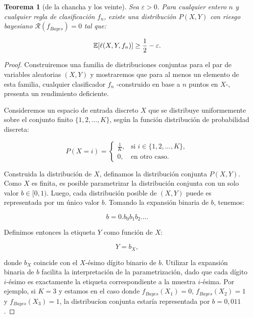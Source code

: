 \documentclass{article}
\newtheorem{thm}{Teorema}[subsection]
\begin{document}
\begin{thm}[de la chancha y los veinte]
Sea \(\varepsilon > 0\). Para cualquier entero \(n\) y cualquier 
regla de clasificación \(f_n\), existe una distribución \(P(X, Y)\) con riesgo bayesiano 
\(\mathcal{R}(f_{Bayes}) = 0\) tal que:

\[
\mathbb{E}[\ell(X,Y,f_n)] \geq \frac{1}{2} - \varepsilon.\newline
\]
\end{thm}

\begin{proof}

Construiremos una familia de distribuciones conjuntas para el par de variables aleatorias \((X, Y)\) y mostraremos que para al menos un 
elemento de esta familia, cualquier clasificador \(f_n\) -construido en base a $n$ puntos en $X$-, presenta un rendimiento deficiente.\newline

Consideremos un espacio de entrada 
discreto \(X\) que se distribuye uniformemente sobre el conjunto finito \(\{1, 2, \dots, K\}\), 
según la función distribución de probabilidad discreta:

\[
P(X = i) = \begin{cases} 
\frac{1}{K}, & \text{si } i \in \{1, 2, \dots, K\}, \\ 
0, & \text{en otro caso}.
\end{cases}
\]


Construida la distribución de \(X\), definamos la distribución conjunta \(P(X,Y)\). Como \(X\) es finita,
es posible parametrizar la distribución conjunta con un solo valor
\(b \in [0,1)\). Luego, cada distribución posible de $(X,Y)$ puede es representada por un único valor \(b\).
Tomando la expansión binaria de $b$, tenemos:

\[
b = 0.b_0 b_1 b_2 \dots.
\]

Definimos entonces la etiqueta \(Y\) como función de \(X\):

\[
Y = b_X,
\]

donde \(b_X\) coincide con el \(X\)-ésimo dígito binario de \(b\). Utilizar la expansión binaria de $b$ facilita la interpretación
de la parametrización, dado que cada dígito $i$-ésimo es exactamente la etiqueta correspondiente a la muestra $i$-ésima.
Por ejemplo, si \(K=3\) y estamos en el caso donde  \(f_{Bayes}(X_1)=0\),  \(f_{Bayes}(X_2)=1\) y \(f_{Bayes}(X_3)=1\), 
la distribucíon conjunta estaría representada por $b=0,011$.\newline



\end{proof}
\end{document}
